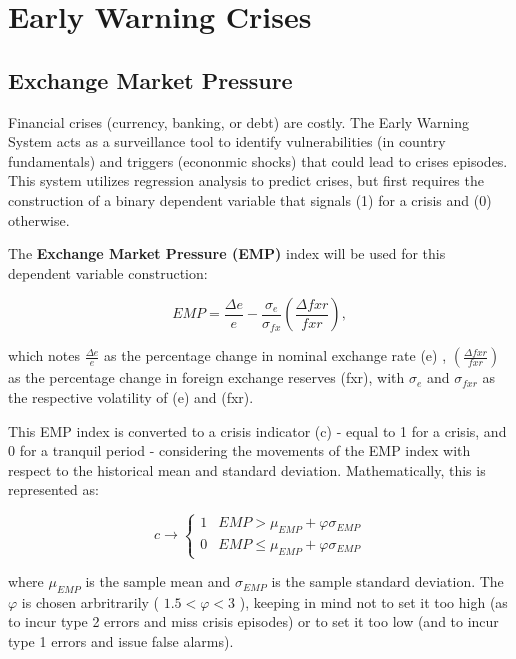 \documentclass[12pt]{article}
\begin{document}
\section{Early Warning Crises}
\subsection{Exchange Market Pressure}

Financial crises (currency, banking, or debt) are costly. The Early Warning System acts as a surveillance tool to identify vulnerabilities (in country fundamentals) and triggers (econonmic shocks) that could lead to crises episodes. This system utilizes regression analysis to predict crises, but first requires the construction of a binary dependent variable that signals (1) for a crisis and (0) otherwise.

\noindent \: \: The \textbf{Exchange Market Pressure (EMP)} index will be used for this dependent variable construction:

$$EMP = \frac{\Delta e}{e} - \frac{\sigma_{e}}{\sigma_{fx}} \left(\frac{\Delta fxr}{fxr}\right),$$

\noindent which notes $\frac{\Delta e}{e}$ as the percentage change in nominal exchange rate (e) , $\left(\frac{\Delta fxr}{fxr}\right)$ as the percentage change in foreign exchange reserves (fxr), with $\sigma_{e}$ and $\sigma_{fxr}$ as the respective volatility of (e) and (fxr). 

\noindent This EMP index is converted to a crisis indicator (c) - equal to 1 for a crisis, and 0 for a tranquil period - considering the movements of the EMP index with respect to the historical mean and standard deviation. Mathematically, this is represented as:

  \begin{equation*}
   c \rightarrow
        \begin{cases}
            \text{1} & EMP > \mu_{EMP} + \varphi \sigma_{EMP} \\
            \text{0}  & EMP \leq \mu_{EMP} + \varphi \sigma_{EMP}
        \end{cases}
    \end{equation*}

where $\mu_{EMP}$ is the sample mean and $\sigma_{EMP}$ is the sample standard deviation. The $\varphi$ is chosen arbritrarily ( $1.5<\varphi <3$ ), keeping in mind not to set it too high (as to incur type 2 errors and miss crisis episodes) or to set it too low (and to incur type 1 errors and issue false alarms). 
\end{document}

